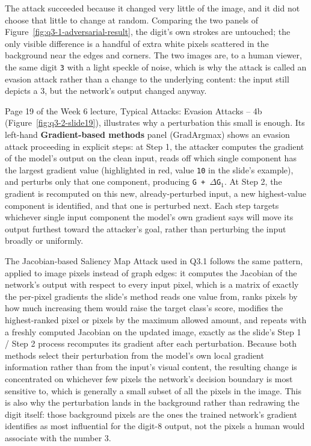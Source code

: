 The attack succeeded because it changed very little of the image, and it did not choose that little to change at random. Comparing the two panels of Figure~\ref{fig:q3-1-adversarial-result}, the digit's own strokes are untouched; the only visible difference is a handful of extra white pixels scattered in the background near the edges and corners. The two images are, to a human viewer, the same digit \texttt{3} with a light speckle of noise, which is why the attack is called an evasion attack rather than a change to the underlying content: the input still depicts a 3, but the network's output changed anyway.

Page 19 of the Week 6 lecture, \textquotedbl{}Typical Attacks: Evasion Attacks -- 4b\textquotedbl{} (Figure~\ref{fig:q3-2-slide19}), illustrates why a perturbation this small is enough. Its left-hand \textbf{Gradient-based methods} panel (GradArgmax) shows an evasion attack proceeding in explicit steps: at Step 1, the attacker computes the gradient of the model's output on the clean input, reads off which single component has the largest gradient value (highlighted in red, value \texttt{10} in the slide's example), and perturbs only that one component, producing \texttt{G + \(\Delta\)G\(_1\)}. At Step 2, the gradient is recomputed on this new, already-perturbed input, a new highest-value component is identified, and that one is perturbed next. Each step targets whichever single input component the model's own gradient says will move its output furthest toward the attacker's goal, rather than perturbing the input broadly or uniformly.


The Jacobian-based Saliency Map Attack used in Q3.1 follows the same pattern, applied to image pixels instead of graph edges: it computes the Jacobian of the network's output with respect to every input pixel, which is a matrix of exactly the per-pixel gradients the slide's method reads one value from, ranks pixels by how much increasing them would raise the target class's score, modifies the highest-ranked pixel or pixels by the maximum allowed amount, and repeats with a freshly computed Jacobian on the updated image, exactly as the slide's Step 1 / Step 2 process recomputes its gradient after each perturbation. Because both methods select their perturbation from the model's own local gradient information rather than from the input's visual content, the resulting change is concentrated on whichever few pixels the network's decision boundary is most sensitive to, which is generally a small subset of all the pixels in the image. This is also why the perturbation lands in the background rather than redrawing the digit itself: those background pixels are the ones the trained network's gradient identifies as most influential for the digit-8 output, not the pixels a human would associate with the number 3.

